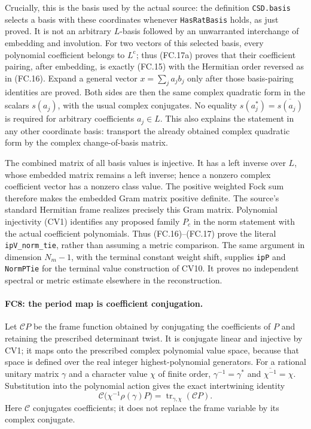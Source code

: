 \documentclass[11pt,a4paper]{article}
\numberwithin{equation}{section}
\theoremstyle{remark}\newtheorem{remark}[theorem]{Remark}
\begin{document}
Crucially, this is the basis used by the actual source: the definition
\texttt{CSD.basis} selects a basis with these coordinates whenever
\texttt{HasRatBasis} holds, as just proved. It is not an arbitrary
$L$-basis followed by an unwarranted interchange of embedding and
involution. For two vectors of this selected basis, every polynomial
coefficient belongs to $L^{\mathrm c}$; thus (FC.17a) proves that
their coefficient pairing, after embedding, is exactly (FC.15) with
the Hermitian order reversed as in (FC.16). Expand a general vector
$x=\sum_j a_jb_j$ only after those basis-pairing identities are proved.
Both sides are then the same complex quadratic form in the scalars
$s(a_j)$, with the usual complex conjugates. No equality
$s(a_j^*)=\overline{s(a_j)}$ is required for arbitrary coefficients
$a_j\in L$. This also explains the statement in any other coordinate
basis: transport the already obtained complex quadratic form by the
complex change-of-basis matrix.

The combined matrix of all basis values is injective. It has a left
inverse over $L$, whose embedded matrix remains a left inverse; hence
a nonzero complex coefficient vector has a nonzero class value.
The positive weighted Fock sum therefore makes the embedded Gram
matrix positive definite. The source's standard Hermitian frame
realizes precisely this Gram matrix. Polynomial injectivity (CV1)
identifies any proposed family $P_c$ in the norm statement with the
actual coefficient polynomials. Thus (FC.16)--(FC.17) prove the literal
\texttt{ipV\_\allowbreak norm\_\allowbreak tie}, rather than assuming a metric comparison.
The same argument in dimension $N_m-1$, with the terminal constant
weight shift, supplies \texttt{ipP} and \texttt{NormPTie} for the
terminal value construction of CV10. It proves no independent spectral
or metric estimate elsewhere in the reconstruction.

\paragraph{FC8: the period map is coefficient conjugation.}
Let $\mathcal C P$ be the frame function obtained by conjugating the
coefficients of $P$ and retaining the prescribed determinant twist.
It is conjugate linear and injective by CV1; it maps onto the prescribed
complex polynomial value space, because that space is defined over the
real integer highest-polynomial generators. For a rational unitary
matrix $\gamma$ and a character value $\chi$ of finite order,
$\gamma^{-1}=\gamma^*$ and $\overline{\chi^{-1}}=\chi$.
Substitution into the polynomial action gives the exact intertwining
identity
\[
 \mathcal C\bigl(\chi^{-1}\rho(\gamma)P\bigr)
          =\operatorname{tr}_{\gamma,\chi}(\mathcal C P).
 \tag{FC.18}
\]
Here $\mathcal C$ conjugates coefficients; it does not replace the
frame variable by its complex conjugate.
\end{document}

